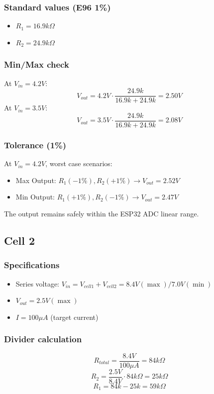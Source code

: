 \documentclass{article}
\begin{document}
\subsubsection{Standard values (E96 1\%)}
\begin{itemize}
\item $R_1 = 16.9k\Omega$
\item $R_2 = 24.9k\Omega$
\end{itemize}

\subsubsection{Min/Max check}
At $V_{in} = 4.2V$:
$$V_{out} = 4.2V \cdot \frac{24.9k}{16.9k + 24.9k} = 2.50V$$
At $V_{in} = 3.5V$:
$$V_{out} = 3.5V \cdot \frac{24.9k}{16.9k + 24.9k} = 2.08V$$

\subsubsection{Tolerance (1\%)}
At $V_{in} = 4.2V$, worst case scenarios:
\begin{itemize}
    \item Max Output: $R_1 (-1\%), R_2 (+1\%) \rightarrow V_{out} = 2.52V$
    \item Min Output: $R_1 (+1\%), R_2 (-1\%) \rightarrow V_{out} = 2.47V$
\end{itemize}
The output remains safely within the ESP32 ADC linear range.

\subsection{Cell 2}
\subsubsection{Specifications}
\begin{itemize}
\item Series voltage: $V_{in} = V_{cell1} + V_{cell2} = 8.4V (\max) / 7.0V (\min)$
\item $V_{out} = 2.5V (\max)$
\item $I = 100\mu A$ (target current)
\end{itemize}

\subsubsection{Divider calculation}
$$R_{total} = \frac{8.4V}{100\mu A} = 84k\Omega$$
$$R_2 = \frac{2.5V}{8.4V} \cdot 84k\Omega = 25k\Omega$$
$$R_1 = 84k - 25k = 59k\Omega$$
\end{document}
